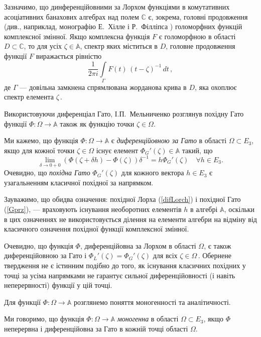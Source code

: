 \documentclass[11pt, reqno]{amsart}
\begin{document}
Зазначимо, що динференційовними за Лорхом функціями в комутативних
асоціативних банахових алгебрах над полем $\mathbb{C}$ є, зокрема,
головні продовження (див., наприклад, монографію Е.~Хілле і Р.~Філліпса \cite[с.~182]{Hil_Filips})
голоморфних функцій комплексної змінної. Якщо комплексна функція
$F$ є голоморфною в області $D\subset \mathbb{C}$, то для усіх
$\zeta\in \mathbb{A}$, спектр яких міститься в $D$, головне
продовження функції $F$ виражається рівністю
\begin{equation}\label{pr-ext}
\frac{1}{2\pi i}\int\limits_{\Gamma}
F(t)\,(t-\zeta)^{-1}\,dt\,,
\end{equation}
де $\Gamma$ --- довільна замкнена спрямлювана жорданова
крива в $D$, яка охоплює спектр елемента $\zeta$\,.


Використовуючи диференціал Гато,  І.П.~Мельниченко
\cite{Mel'nichenko75} розглянув похідну Гато функції $\Phi \colon \Omega\rightarrow\mathbb{A}$
також як функцію точки $\zeta\in\Omega$.


Ми кажемо, що функція $\Phi \colon
\Omega\rightarrow\mathbb{A}$ є {\em диференційовною за Гато} в
області $\Omega\subset E_3$, якщо для кожної точки
$\zeta\in\Omega$ існує елемент $\Phi_G'(\zeta)\in\mathbb{A}$
такий, що
\begin{equation}\label{Gprz}
\lim\limits_{\delta\rightarrow 0+0} \left(\Phi(\zeta+\delta
h)-\Phi(\zeta)\right)\delta^{-1}= h\Phi_G'(\zeta)\quad\forall h\in
E_{3}.
\end{equation}
Очевидно, що
{\em похідна Гато} $\Phi_G'(\zeta)$ для кожного вектора $h\in E_{3}$
є узагальненням класичної похідної за напрямком.

Зауважимо, що обидва означення: похідної Лорха (\ref{difLorch}) і
похідної Гато (\ref{Gprz}), --- враховують існування необоротних
елементів $h$ в алгебрі $\mathbb{A}$, оскільки в цих означеннях не
використовується ділення на елементи алгебри на відміну від
класичного означення похідної функції комплексної змінної.

Очевидно, що функція $\Phi$, диференційовна за Лорхом в
області $\Omega$, є також диференційовною за Гато і
$\Phi_L'(\zeta)=\Phi_G'(\zeta)$ для всіх $\zeta\in\Omega$\,.
Обернене твердження не є істинним подібно до того, як
існування класичних похідних у точці за усіма напрямками не гарантує сильної
диференційовності (і навіть неперервності) функції у цій точці.

Для  функції
$\Phi\colon\Omega\rightarrow\mathbb{A}$ розглянемо поняття моногенності та аналітичності.

Ми говоримо, що функція  $\Phi \colon \Omega \rightarrow
\mathbb{A}$  \textit{моногенна} в області $\Omega\subset E_{3}$,
якщо $\Phi$ неперервна і диференційовна за Гато  в кожній точці
області $\Omega$.
\end{document}
